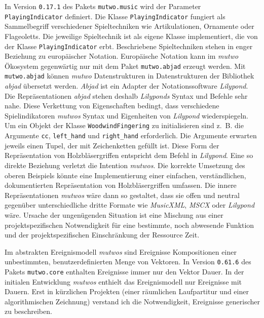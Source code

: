 \documentclass[12pt,a4paper,ngerman]{article}
\begin{document}
In Version \texttt{0.17.1} des Pakets \texttt{mutwo.music} wird der Parameter \texttt{PlayingIndicator} definiert.
Die Klasse \texttt{PlayingIndicator} fungiert als Sammelbegriff verschiedener Spieltechniken wie Artikulationen, Ornamente oder Flageoletts.
Die jeweilige Spieltechnik ist als eigene Klasse implementiert, die von der Klasse \texttt{PlayingIndicator} erbt.
Beschriebene Spieltechniken stehen in enger Beziehung zu europäischer Notation.
Europäische Notation kann im \emph{mutwo} Ökosystem gegenwärtig nur mit dem Paket \texttt{mutwo.abjad} erzeugt werden.
Mit \texttt{mutwo.abjad} können \emph{mutwo} Datenstrukturen in Datenstrukturen der Bibliothek \emph{abjad} übersetzt werden.
\emph{Abjad} ist ein Adapter der Notationssoftware \emph{Lilypond}.
Die Repräsentationen \emph{abjad} stehen deshalb \emph{Lilyponds} Syntax und Befehle sehr nahe.
Diese Verkettung von Eigenschaften bedingt, dass verschiedene Spielindikatoren \emph{mutwos} Syntax und Eigenheiten von \emph{Lilypond} wiederspiegeln.
Um ein Objekt der Klasse \texttt{WoodwindFingering} zu initialisieren sind z.~B. die Argumente \texttt{cc}, \texttt{left\_hand} und \texttt{right\_hand} erforderlich.
Die Argumente erwarten jeweils einen Tupel, der mit Zeichenketten gefüllt ist.
Diese Form der Repräsentation von Holzbläsergriffen entspricht dem Befehl in \emph{Lilypond}. 
Eine so direkte Beziehung verletzt die Intention \emph{mutwos}.
Die korrekte Umsetzung des oberen Beispiels könnte eine Implementierung einer einfachen, verständlichen, dokumentierten Repräsentation von Holzbläsergriffen umfassen.
Die innere Repräsentationen \emph{mutwos} wäre dann so gestaltet, dass sie offen und neutral gegenüber unterschiedliche dritte Formate wie \emph{MusicXML}, \emph{MSCX} oder \emph{Lilypond} wäre.
Ursache der ungenügenden Situation ist eine Mischung aus einer projektspezifischen Notwendigkeit für eine bestimmte, noch abwesende Funktion und der projektspezifischen Einschränkung der Ressource Zeit.

\smallskip

Im abstrakten Ereignismodell \emph{mutwos} sind Ereignisse Kompositionen einer unbestimmten, benutzerdefinierten Menge von Vektoren.
In Version \texttt{0.61.6} des Pakets \texttt{mutwo.core} enthalten Ereignisse immer nur den Vektor Dauer.
In der initialen Entwicklung \emph{mutwos} enthielt das Ereignismodell nur Ereignisse mit Dauern.
Erst in kürzlichen Projekten (einer räumlichen Laufpartitur und einer algorithmischen Zeichnung) verstand ich die Notwendigkeit, Ereignisse generischer zu beschreiben.
\end{document}
